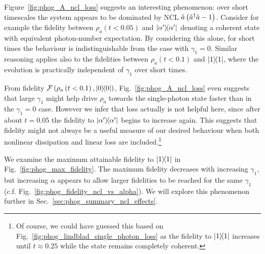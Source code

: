 Figure~\ref{fig:phog_A_ncl_loss} suggests an interesting phenomenon: over short timescales the system appears to be dominated by NCL $\hat{a}\left(\hat{a}^\dagger \hat{a} - 1\right)$. Consider for example the fidelity between $\rho_a\left(t < 0.05\right)$ and $\dyad{\alpha^\prime}$ denoting a coherent state with equivalent photon-number expectation. By considering this alone, for short times the behaviour is indistinguishable from the case with $\gamma_1 = 0$. Similar reasoning applies also to the fidelities between $\rho_a\left(t < 0.1\right)$ and $\dyad{1}$, where the evolution is practically independent of $\gamma_1$ over short times.

From fidelity $\mathcal{F}\left( \rho_a\left(t<0.1\right), \dyad{0}\right)$, Fig.~\ref{fig:phog_A_ncl_loss} even suggests that large $\gamma_1$ might help drive $\rho_a$ towards the single-photon state faster than in the $\gamma_1 = 0$ case. However we infer that loss actually is not helpful here, since after about $t=0.05$ the fidelity to $\dyad{\alpha^\prime}$ begins to increase again. This suggests that fidelity might not always be a useful measure of our desired behaviour when both nonlinear dissipation and linear loss are included.\footnote{Of course, we could have guessed this based on Fig.~\ref{fig:phog_lindblad_single_photon_loss} as the fidelity to $\dyad{1}$ increases until $t\approx 0.25$ while the state remains completely coherent.}

We examine the maximum attainable fidelity to $\dyad{1}$ in Fig.~\ref{fig:phog_max_fidelity}. The maximum fidelity decreases with increasing $\gamma_1$, but increasing $\alpha$ appears to allow larger fidelities to be reached for the same $\gamma_1$ (c.f. Fig.~\ref{fig:phog_fidelity_ncl_vs_alpha}). We will explore this phenomenon further in Sec.~\ref{sec:phog_summary_ncl_effects}.



